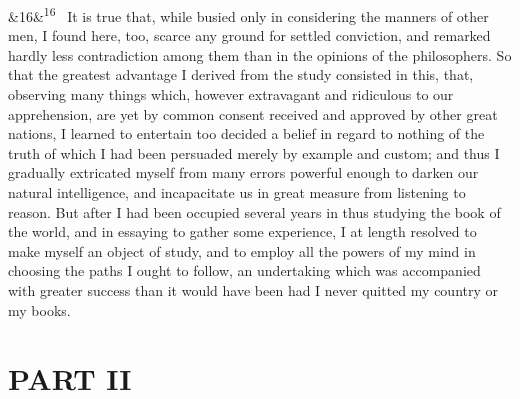 \documentclass[12pt]{article}
\newcommand{\para}[1][]{\par\noindent\ifx&#1&\else\textsuperscript{\footnotesize #1}~\fi}
\begin{document}
\para[16] It is true that, while busied only in considering the manners of other men, I found here, too, scarce any ground for settled conviction, and remarked hardly less contradiction among them than in the opinions of the philosophers. So that the greatest advantage I derived from the study consisted in this, that, observing many things which, however extravagant and ridiculous to our apprehension, are yet by common consent received and approved by other great nations, I learned to entertain too decided a belief in regard to nothing of the truth of which I had been persuaded merely by example and custom; and thus I gradually extricated myself from many errors powerful enough to darken our natural intelligence, and incapacitate us in great measure from listening to reason. But after I had been occupied several years in thus studying the book of the world, and in essaying to gather some experience, I at length resolved to make myself an object of study, and to employ all the powers of my mind in choosing the paths I ought to follow, an undertaking which was accompanied with greater success than it would have been had I never quitted my country or my books.

\section*{PART II}
\end{document}
